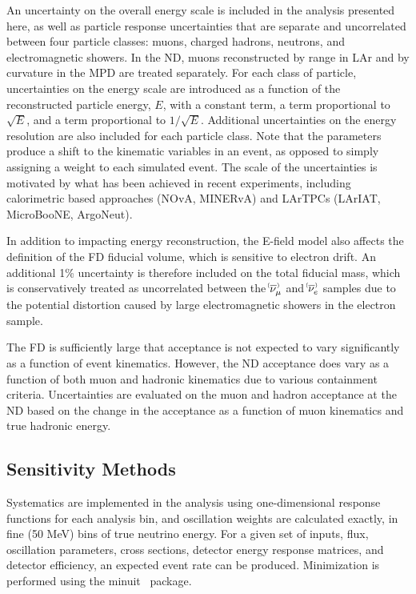 An uncertainty on the overall energy scale is included in the analysis presented here, as well as particle response uncertainties that are separate and uncorrelated between four particle classes: muons, charged hadrons, neutrons, and electromagnetic showers. In the ND, muons reconstructed by range in LAr and by curvature in the MPD are treated separately. For each class of particle, uncertainties on the energy scale are introduced as a function of the reconstructed particle energy, $E$, with a constant term, a term proportional to $\sqrt{E}$, and a term proportional to $1/\sqrt{E}$. Additional uncertainties on the energy resolution are also included for each particle class. Note that the parameters produce a shift to the kinematic variables in an event, as opposed to simply assigning a weight to each simulated event. The scale of the uncertainties is motivated by what has been achieved in recent experiments, including calorimetric based approaches (NOvA, MINERvA) and LArTPCs (LArIAT, MicroBooNE, ArgoNeut).

In addition to impacting energy reconstruction, the E-field model also affects the definition of the FD fiducial volume, which is sensitive to electron drift. An additional 1\% uncertainty is therefore included on the total fiducial mass, which is conservatively treated as uncorrelated between the $\nu^{\bracketbar}_{\mu}$ and $\nu^{\bracketbar}_{e}$ samples due to the potential distortion caused by large electromagnetic showers in the electron sample.

The FD is sufficiently large that acceptance is not expected to vary significantly as a function of event kinematics. However, the ND acceptance does vary as a function of both muon and hadronic kinematics due to various containment criteria. Uncertainties are evaluated on the muon and hadron acceptance at the ND based on the change in the acceptance as a function of muon kinematics and true hadronic energy.

\subsection{Sensitivity Methods}
Systematics are implemented in the analysis using one-dimensional response functions for each analysis bin, and oscillation weights are calculated exactly, in fine (50 MeV) bins of true neutrino energy. For a given set of inputs, flux, oscillation parameters, cross sections, detector energy response matrices, and detector efficiency, an expected event rate can be produced. Minimization is performed using the {\sc minuit}~\cite{James:1994vla} package.

